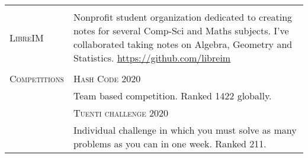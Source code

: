 \documentclass[a4paper,10pt]{article} %
\begin{document}
\begin{tabular}{p{3cm}|p{11cm}}
  \multicolumn{2}{c}{}                                                                                                                                                                                                                                                                \\
  \textsc{LibreIM}                    &
                                          \footnotesize Nonprofit student organization dedicated to creating notes for several Comp-Sci and Maths subjects. I've collaborated taking notes on Algebra, Geometry and Statistics.
  \url{https://github.com/libreim}                                                                                                                                                                                                        \\

  \multicolumn{2}{c}{}                                                                                                                                                                                                                                                                \\
  \textsc{Competitions}                  & \textsc{Hash Code 2020}                                                                                                                                                                                                                    \\
                                         & \footnotesize Team based competition. Ranked 1422 globally.                                                                                                                                                                             \\
                                         & \textsc{Tuenti challenge 2020}                                                                                                                                                                                                             \\
                                         & \footnotesize Individual challenge in which you must solve as many problems as you can in one week. Ranked 211.
\end{tabular}\\

\end{document}

